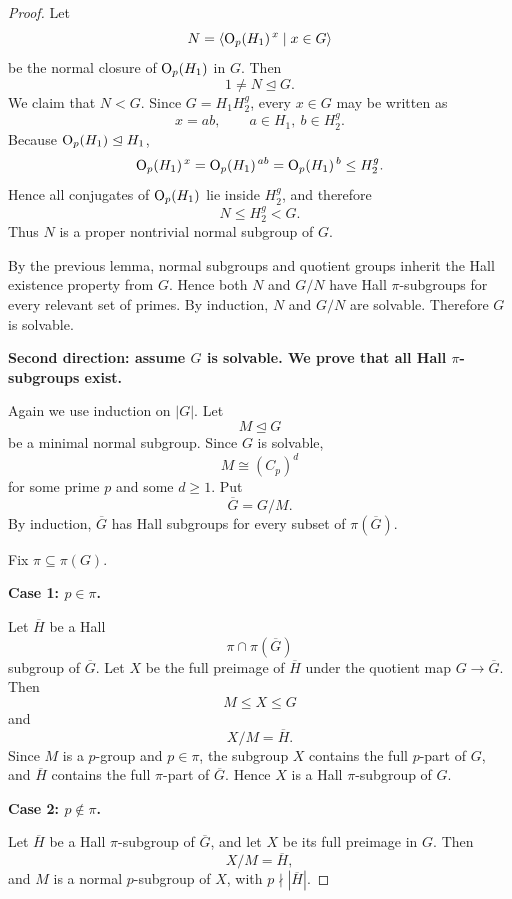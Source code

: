 \begin{proof}
Let
\[
    N=\left\langle \mathrm{O}_{p}(H_1)^{\,x}\mid x\in G\right\rangle
\]
be the normal closure of \(\mathrm{O}_{p}(H_1)\) in \(G\). Then
\[
    1\neq N\trianglelefteq G.
\]
We claim that \(N<G\). Since \(G=H_1H_2^g\), every \(x\in G\) may be written as
\[
    x=ab,
    \qquad
    a\in H_1,\ b\in H_2^g.
\]
Because \(\mathrm{O}_{p}(H_1)\trianglelefteq H_1\),
\[
    \mathrm{O}_{p}(H_1)^{\,x}
    =
    \mathrm{O}_{p}(H_1)^{\,ab}
    =
    \mathrm{O}_{p}(H_1)^{\,b}
    \leq H_2^g.
\]
Hence all conjugates of \(\mathrm{O}_{p}(H_1)\) lie inside \(H_2^g\), and therefore
\[
    N\leq H_2^g<G.
\]
Thus \(N\) is a proper nontrivial normal subgroup of \(G\).

By the previous lemma, normal subgroups and quotient groups inherit the Hall
existence property from \(G\). Hence both \(N\) and \(G/N\) have Hall
\(\pi\)-subgroups for every relevant set of primes. By induction, \(N\) and
\(G/N\) are solvable. Therefore \(G\) is solvable.

\medskip

\noindent
\textbf{Second direction: assume \(G\) is solvable. We prove that all Hall
\(\pi\)-subgroups exist.}

Again we use induction on \(|G|\). Let
\[
    M\trianglelefteq G
\]
be a minimal normal subgroup. Since \(G\) is solvable,
\[
    M\cong (C_p)^d
\]
for some prime \(p\) and some \(d\geq 1\). Put
\[
    \overline{G}=G/M.
\]
By induction, \(\overline{G}\) has Hall subgroups for every subset of
\(\pi(\overline{G})\).

Fix \(\pi\subseteq \pi(G)\).

\medskip

\noindent
\textbf{Case 1: \(p\in \pi\).}

Let \(\overline{H}\) be a Hall
\[
    \pi\cap \pi(\overline{G})
\]
subgroup of \(\overline{G}\). Let \(X\) be the full preimage of
\(\overline{H}\) under the quotient map \(G\to \overline{G}\). Then
\[
    M\leq X\leq G
\]
and
\[
    X/M=\overline{H}.
\]
Since \(M\) is a \(p\)-group and \(p\in \pi\), the subgroup \(X\) contains the full
\(p\)-part of \(G\), and \(\overline{H}\) contains the full \(\pi\)-part of
\(\overline{G}\). Hence \(X\) is a Hall \(\pi\)-subgroup of \(G\).

\medskip

\noindent
\textbf{Case 2: \(p\notin \pi\).}

Let \(\overline{H}\) be a Hall \(\pi\)-subgroup of \(\overline{G}\), and let \(X\)
be its full preimage in \(G\). Then
\[
    X/M=\overline{H},
\]
and \(M\) is a normal \(p\)-subgroup of \(X\), with \(p\nmid |\overline{H}|\).


\end{proof}
